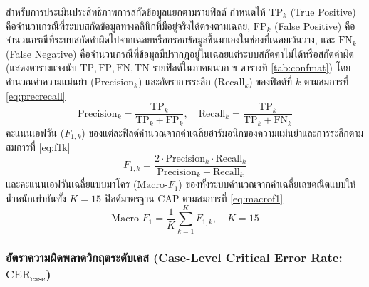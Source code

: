 สำหรับการประเมินประสิทธิภาพการสกัดข้อมูลแยกตามรายฟิลด์ กำหนดให้ $\mathrm{TP}_k$ (True Positive) คือจำนวนกรณีที่ระบบสกัดข้อมูลทางคลินิกที่มีอยู่จริงได้ตรงตามเฉลย, $\mathrm{FP}_k$ (False Positive) คือจำนวนกรณีที่ระบบสกัดค่าผิดไปจากเฉลยหรือกรอกข้อมูลขึ้นมาเองในช่องที่เฉลยเว้นว่าง, และ $\mathrm{FN}_k$ (False Negative) คือจำนวนกรณีที่ข้อมูลมีปรากฏอยู่ในเฉลยแต่ระบบสกัดค่าไม่ได้หรือสกัดค่าผิด (แสดงตารางแจงนับ $\mathrm{TP}, \mathrm{FP}, \mathrm{FN}, \mathrm{TN}$ รายฟิลด์ในภาคผนวก ข ตารางที่ \ref{tab:confmat}) โดยคำนวณค่าความแม่นยำ ($\mathrm{Precision}_k$) และอัตราการระลึก ($\mathrm{Recall}_k$) ของฟิลด์ที่ $k$ ตามสมการที่ \eqref{eq:precrecall}
\begin{equation}
\mathrm{Precision}_k = \frac{\mathrm{TP}_k}{\mathrm{TP}_k + \mathrm{FP}_k}, \quad \mathrm{Recall}_k = \frac{\mathrm{TP}_k}{\mathrm{TP}_k + \mathrm{FN}_k}
\label{eq:precrecall}
\end{equation}
คะแนนเอฟวัน ($F_{1,k}$) ของแต่ละฟิลด์คำนวณจากค่าเฉลี่ยฮาร์มอนิกของความแม่นยำและการระลึกตามสมการที่ \eqref{eq:f1k}
\begin{equation}
F_{1,k} = \frac{2 \cdot \mathrm{Precision}_k \cdot \mathrm{Recall}_k}{\mathrm{Precision}_k + \mathrm{Recall}_k}
\label{eq:f1k}
\end{equation}
และคะแนนเอฟวันเฉลี่ยแบบมาโคร ($\mathrm{Macro\text{-}}F_1$) ของทั้งระบบคำนวณจากค่าเฉลี่ยเลขคณิตแบบให้น้ำหนักเท่ากันทั้ง $K = 15$ ฟิลด์มาตรฐาน CAP ตามสมการที่ \eqref{eq:macrof1}
\begin{equation}
\mathrm{Macro\text{-}}F_1 = \frac{1}{K} \sum_{k=1}^{K} F_{1,k}, \quad K = 15
\label{eq:macrof1}
\end{equation}

\subsubsection{อัตราความผิดพลาดวิกฤตระดับเคส (Case-Level Critical Error Rate: $\mathrm{CER}_{\mathrm{case}}$)}

